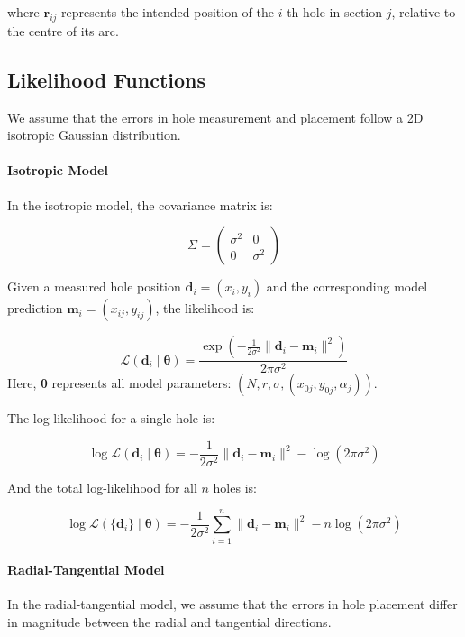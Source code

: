 \documentclass[11pt]{article}
\begin{document}
where $\mathbf{r}_{ij}$ represents the intended position of the $i$-th hole in section $j$, relative to the centre of its arc.


\subsection{Likelihood Functions}

We assume that the errors in hole measurement and placement follow a 2D isotropic Gaussian distribution.

\paragraph{Isotropic Model}
In the isotropic model, the covariance matrix is:

$$\Sigma = \begin{pmatrix} \sigma^2 & 0 \\ 0 & \sigma^2 \end{pmatrix}$$

Given a measured hole position $\mathbf{d}_i = (x_i, y_i)$ and the corresponding model prediction $\mathbf{m}_i = (x_{ij}, y_{ij})$, the likelihood is:

$$\mathcal{L}(\mathbf{d}_i \mid \boldsymbol{\theta}) = \frac{\exp \left(-\frac{1}{2\sigma^2}\|\mathbf{d}_i - \mathbf{m}_i\|^2\right)}{2\pi\sigma^2}$$
Here, $\boldsymbol{\theta}$ represents all model parameters: $(N, r, \sigma, {(x_{0j}, y_{0j}, \alpha_j)})$.

The log-likelihood for a single hole is:

$$\log \mathcal{L}(\mathbf{d}_i \mid \boldsymbol{\theta}) = -\frac{1}{2\sigma^2}\|\mathbf{d}_i - \mathbf{m}_i\|^2 - \log(2\pi\sigma^2)$$

And the total log-likelihood for all $n$ holes is:

\begin{equation}
\label{eq:ml_isotropic}
    \log \mathcal{L}(\{\mathbf{d}_i\} \mid \boldsymbol{\theta}) = -\frac{1}{2\sigma^2}\sum_{i=1}^{n}\|\mathbf{d}_i - \mathbf{m}_i\|^2 - n\log(2\pi\sigma^2)
\end{equation}

\paragraph{Radial-Tangential Model}


In the radial-tangential model, we assume that the errors in hole placement differ in magnitude between the radial and tangential directions.
\end{document}
